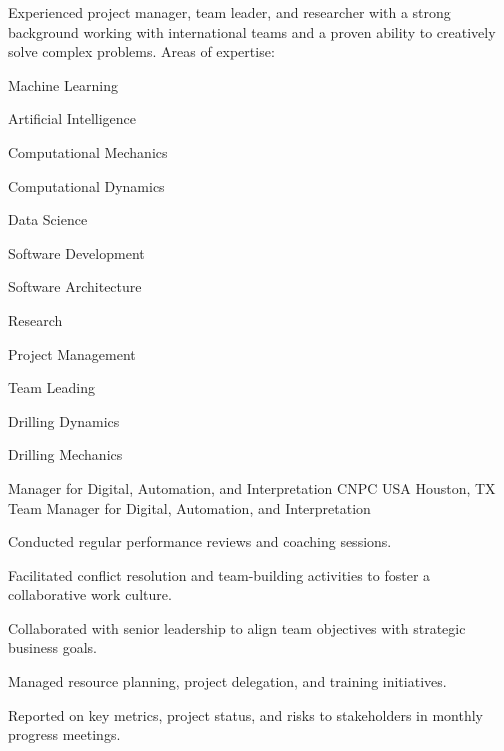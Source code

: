 \documentclass{leresume}
\begin{document}
	\thispagestyle{leempty}
	\makeresumeheaderC

	Experienced project manager, team leader, and researcher with a strong background working with international teams and a proven ability to creatively solve complex problems. Areas of expertise:
	\vspace{-6pt}
	\begin{multicols}{3}
		\begin{bulletedlist}
			
			\item Machine Learning
			\item Artificial Intelligence
			\item Computational Mechanics
			\item Computational Dynamics
			\item Data Science
			\item Software Development
			\item Software Architecture
			\item Research
			\item Project Management
			\item Team Leading
			\item Drilling Dynamics
			\item Drilling Mechanics
		\end{bulletedlist}
		\end{multicols}

	
		
            {Manager for Digital, Automation, and Interpretation}
            {CNPC USA}
			{Houston, TX}
			Team Manager for Digital, Automation, and Interpretation
		\begin{bulletedlist}
			
		\item
		
				Conducted regular performance reviews and coaching sessions.
			
		\item
		
				Facilitated conflict resolution and team-building activities to foster a collaborative work culture.
			
		\item
		
				Collaborated with senior leadership to align team objectives with strategic business goals.
			
		\item
		
				Managed resource planning, project delegation, and training initiatives.
			
		\item
		
				Reported on key metrics, project status, and risks to stakeholders in monthly progress meetings.
			
		\end{bulletedlist}
	
\end{document}
